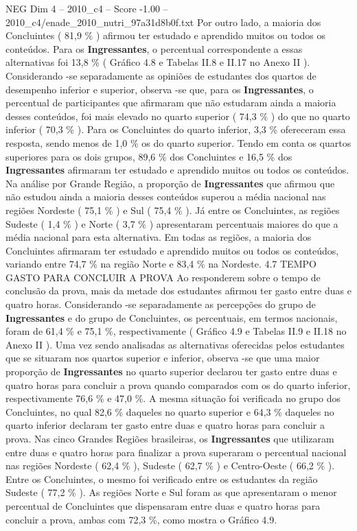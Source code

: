 \begin{textsample}{NEG Dim 4 – 2010\_c4 – Score -1.00 – 2010\_c4/enade\_2010\_nutri\_97a31d8b0f.txt}
Por outro lado, a maioria dos Concluintes ( 81,9 \% ) afirmou ter estudado e aprendido muitos ou todos os conteúdos.
Para os \textbf{Ingressantes}, o percentual correspondente a essas alternativas foi 13,8 \% ( Gráfico 4.8 e Tabelas II.8 e II.17 no Anexo II ).
Considerando -se separadamente as opiniões de estudantes dos quartos de desempenho inferior e superior, observa -se que, para os \textbf{Ingressantes}, o percentual de participantes que afirmaram que não estudaram ainda a maioria desses conteúdos, foi mais elevado no quarto superior ( 74,3 \% ) do que no quarto inferior ( 70,3 \% ).
Para os Concluintes do quarto inferior, 3,3 \% ofereceram essa resposta, sendo menos de 1,0 \% os do quarto superior.
Tendo em conta os quartos superiores para os dois grupos, 89,6 \% dos Concluintes e 16,5 \% dos \textbf{Ingressantes} afirmaram ter estudado e aprendido muitos ou todos os conteúdos.
Na análise por Grande Região, a proporção de \textbf{Ingressantes} que afirmou que não estudou ainda a maioria desses conteúdos superou a média nacional nas regiões Nordeste ( 75,1 \% ) e Sul ( 75,4 \% ).
Já entre os Concluintes, as regiões Sudeste ( 1,4 \% ) e Norte ( 3,7 \% ) apresentaram percentuais maiores do que a média nacional para esta alternativa.
Em todas as regiões, a maioria dos Concluintes afirmaram ter estudado e aprendido muitos ou todos os conteúdos, variando entre 74,7 \% na região Norte e 83,4 \% na Nordeste. 4.7 TEMPO GASTO PARA CONCLUIR A PROVA Ao responderem sobre o tempo de conclusão da prova, mais da metade dos estudantes afirmou ter gasto entre duas e quatro horas.
Considerando -se separadamente as percepções do grupo de \textbf{Ingressantes} e do grupo de Concluintes, os percentuais, em termos nacionais, foram de 61,4 \% e 75,1 \%, respectivamente ( Gráfico 4.9 e Tabelas II.9 e II.18 no Anexo II ).
Uma vez sendo analisadas as alternativas oferecidas pelos estudantes que se situaram nos quartos superior e inferior, observa -se que uma maior proporção de \textbf{Ingressantes} no quarto superior declarou ter gasto entre duas e quatro horas para concluir a prova quando comparados com os do quarto inferior, respectivamente 76,6 \% e 47,0 \%.
A mesma situação foi verificada no grupo dos Concluintes, no qual 82,6 \% daqueles no quarto superior e 64,3 \% daqueles no quarto inferior declaram ter gasto entre duas e quatro horas para concluir a prova.
Nas cinco Grandes Regiões brasileiras, os \textbf{Ingressantes} que utilizaram entre duas e quatro horas para finalizar a prova superaram o percentual nacional nas regiões Nordeste ( 62,4 \% ), Sudeste ( 62,7 \% ) e Centro-Oeste ( 66,2 \% ).
Entre os Concluintes, o mesmo foi verificado entre os estudantes da região Sudeste ( 77,2 \% ).
As regiões Norte e Sul foram as que apresentaram o menor percentual de Concluintes que dispensaram entre duas e quatro horas para concluir a prova, ambas com 72,3 \%, como mostra o Gráfico 4.9.

\end{textsample}
